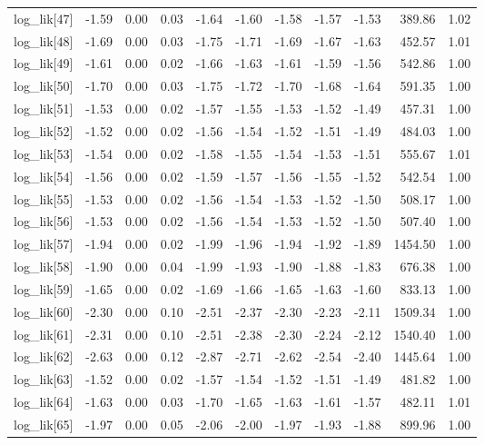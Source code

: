 \begin{table}[ht]
\begin{tabular}{rrrrrrrrrrr}
  log\_lik[47] & -1.59 & 0.00 & 0.03 & -1.64 & -1.60 & -1.58 & -1.57 & -1.53 & 389.86 & 1.02 \\ 
  log\_lik[48] & -1.69 & 0.00 & 0.03 & -1.75 & -1.71 & -1.69 & -1.67 & -1.63 & 452.57 & 1.01 \\ 
  log\_lik[49] & -1.61 & 0.00 & 0.02 & -1.66 & -1.63 & -1.61 & -1.59 & -1.56 & 542.86 & 1.00 \\ 
  log\_lik[50] & -1.70 & 0.00 & 0.03 & -1.75 & -1.72 & -1.70 & -1.68 & -1.64 & 591.35 & 1.00 \\ 
  log\_lik[51] & -1.53 & 0.00 & 0.02 & -1.57 & -1.55 & -1.53 & -1.52 & -1.49 & 457.31 & 1.00 \\ 
  log\_lik[52] & -1.52 & 0.00 & 0.02 & -1.56 & -1.54 & -1.52 & -1.51 & -1.49 & 484.03 & 1.00 \\ 
  log\_lik[53] & -1.54 & 0.00 & 0.02 & -1.58 & -1.55 & -1.54 & -1.53 & -1.51 & 555.67 & 1.01 \\ 
  log\_lik[54] & -1.56 & 0.00 & 0.02 & -1.59 & -1.57 & -1.56 & -1.55 & -1.52 & 542.54 & 1.00 \\ 
  log\_lik[55] & -1.53 & 0.00 & 0.02 & -1.56 & -1.54 & -1.53 & -1.52 & -1.50 & 508.17 & 1.00 \\ 
  log\_lik[56] & -1.53 & 0.00 & 0.02 & -1.56 & -1.54 & -1.53 & -1.52 & -1.50 & 507.40 & 1.00 \\ 
  log\_lik[57] & -1.94 & 0.00 & 0.02 & -1.99 & -1.96 & -1.94 & -1.92 & -1.89 & 1454.50 & 1.00 \\ 
  log\_lik[58] & -1.90 & 0.00 & 0.04 & -1.99 & -1.93 & -1.90 & -1.88 & -1.83 & 676.38 & 1.00 \\ 
  log\_lik[59] & -1.65 & 0.00 & 0.02 & -1.69 & -1.66 & -1.65 & -1.63 & -1.60 & 833.13 & 1.00 \\ 
  log\_lik[60] & -2.30 & 0.00 & 0.10 & -2.51 & -2.37 & -2.30 & -2.23 & -2.11 & 1509.34 & 1.00 \\ 
  log\_lik[61] & -2.31 & 0.00 & 0.10 & -2.51 & -2.38 & -2.30 & -2.24 & -2.12 & 1540.40 & 1.00 \\ 
  log\_lik[62] & -2.63 & 0.00 & 0.12 & -2.87 & -2.71 & -2.62 & -2.54 & -2.40 & 1445.64 & 1.00 \\ 
  log\_lik[63] & -1.52 & 0.00 & 0.02 & -1.57 & -1.54 & -1.52 & -1.51 & -1.49 & 481.82 & 1.00 \\ 
  log\_lik[64] & -1.63 & 0.00 & 0.03 & -1.70 & -1.65 & -1.63 & -1.61 & -1.57 & 482.11 & 1.01 \\ 
  log\_lik[65] & -1.97 & 0.00 & 0.05 & -2.06 & -2.00 & -1.97 & -1.93 & -1.88 & 899.96 & 1.00 \\ 

\end{tabular}
\end{table}
